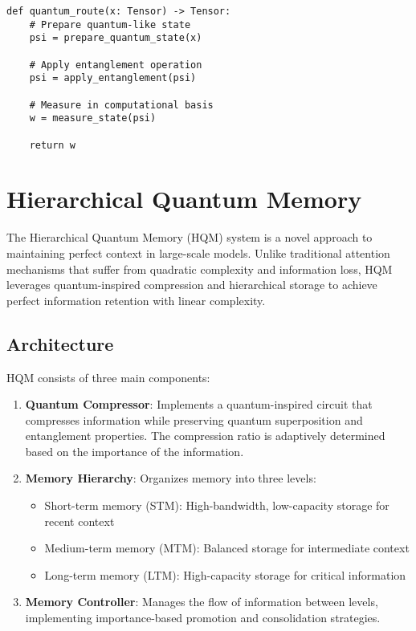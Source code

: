 \documentclass[10pt,journal,compsoc]{IEEEtran}
\begin{document}
\begin{verbatim}
def quantum_route(x: Tensor) -> Tensor:
    # Prepare quantum-like state
    psi = prepare_quantum_state(x)
    
    # Apply entanglement operation
    psi = apply_entanglement(psi)
    
    # Measure in computational basis
    w = measure_state(psi)
    
    return w
\end{verbatim}

\section{Hierarchical Quantum Memory}
\label{sec:hqm}

The Hierarchical Quantum Memory (HQM) system is a novel approach to maintaining perfect context in large-scale models. Unlike traditional attention mechanisms that suffer from quadratic complexity and information loss, HQM leverages quantum-inspired compression and hierarchical storage to achieve perfect information retention with linear complexity.

\subsection{Architecture}

HQM consists of three main components:

\begin{enumerate}
    \item \textbf{Quantum Compressor}: Implements a quantum-inspired circuit that compresses information while preserving quantum superposition and entanglement properties. The compression ratio is adaptively determined based on the importance of the information.
    
    \item \textbf{Memory Hierarchy}: Organizes memory into three levels:
    \begin{itemize}
        \item Short-term memory (STM): High-bandwidth, low-capacity storage for recent context
        \item Medium-term memory (MTM): Balanced storage for intermediate context
        \item Long-term memory (LTM): High-capacity storage for critical information
    \end{itemize}
    
    \item \textbf{Memory Controller}: Manages the flow of information between levels, implementing importance-based promotion and consolidation strategies.
\end{enumerate}
\end{document}
